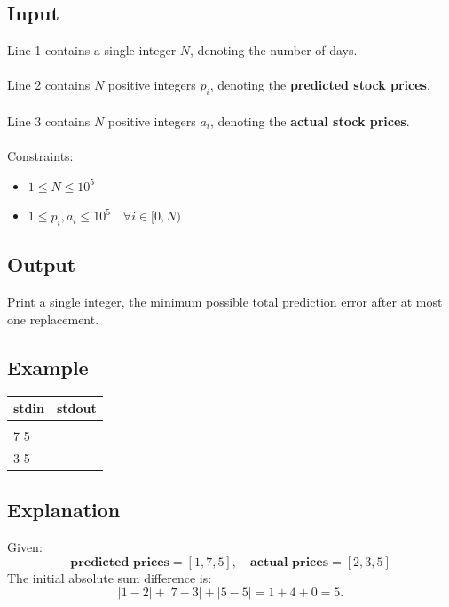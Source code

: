 \documentclass[12pt,a4paper]{article}
\begin{document}
\subsection*{\fontsize{16}{12}Input}
Line 1 contains a single integer $N$, denoting the number of days. \\\\
Line 2 contains $N$ positive integers $p_i$, denoting the \textbf{predicted stock prices}. \\\\
Line 3 contains $N$ positive integers $a_i$, denoting the \textbf{actual stock prices}.
\\\\
\noindent Constraints:
\begin{itemize}
    \item \( 1 \leq N \leq 10^5 \)
    \item \( 1 \leq p_i, a_i \leq 10^5\quad\forall i \in [0, N)\)
\end{itemize}

\subsection*{\fontsize{16}{12}Output}
Print a single integer, the minimum possible total prediction error after at most one replacement.

\newpage

\subsection*{\fontsize{16}{12}Example}
\begin{table}[h]
  \centering
  \begin{tabularx}{\textwidth}{|>{\ttfamily}X|>{\ttfamily}X|}
  \hline
  stdin & stdout \\
  \hline
    3 & 3 \\
    1 7 5 & \\
    2 3 5 & \\  
  \hline
  \end{tabularx}
\end{table}

\subsection*{\fontsize{16}{12}Explanation}
Given:
\[
\textbf{predicted prices} = [1, 7, 5], \quad \textbf{actual prices} = [2, 3, 5]
\]
The initial absolute sum difference is:
\[
\left| 1 - 2 \right| + \left| 7 - 3 \right| + \left| 5 - 5 \right| = 1 + 4 + 0 = 5.
\]
\end{document}
